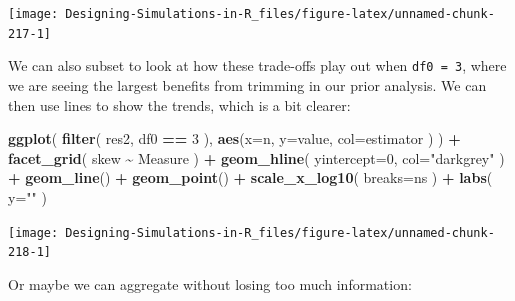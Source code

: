 \documentclass[
]{book}
\newenvironment{Shaded}{\begin{snugshade}}{\end{snugshade}}
\newcommand{\AttributeTok}[1]{\textcolor[rgb]{0.13,0.29,0.53}{#1}}
\newcommand{\DecValTok}[1]{\textcolor[rgb]{0.00,0.00,0.81}{#1}}
\newcommand{\FunctionTok}[1]{\textcolor[rgb]{0.13,0.29,0.53}{\textbf{#1}}}
\newcommand{\NormalTok}[1]{#1}
\newcommand{\SpecialCharTok}[1]{\textcolor[rgb]{0.81,0.36,0.00}{\textbf{#1}}}
\newcommand{\StringTok}[1]{\textcolor[rgb]{0.31,0.60,0.02}{#1}}
\begin{document}
\begin{center}\texttt{[image: Designing-Simulations-in-R\_files/figure-latex/unnamed-chunk-217-1]} \end{center}

We can also subset to look at how these trade-offs play out when \texttt{df0\ =\ 3}, where we are seeing the largest benefits from trimming in our prior analysis.
We can then use lines to show the trends, which is a bit clearer:

\begin{Shaded}
\begin{Highlighting}[]
\FunctionTok{ggplot}\NormalTok{( }\FunctionTok{filter}\NormalTok{( res2, df0 }\SpecialCharTok{==} \DecValTok{3}\NormalTok{ ), }
        \FunctionTok{aes}\NormalTok{(}\AttributeTok{x=}\NormalTok{n, }\AttributeTok{y=}\NormalTok{value, }\AttributeTok{col=}\NormalTok{estimator ) ) }\SpecialCharTok{+}
    \FunctionTok{facet\_grid}\NormalTok{( skew }\SpecialCharTok{\textasciitilde{}}\NormalTok{ Measure ) }\SpecialCharTok{+}
    \FunctionTok{geom\_hline}\NormalTok{( }\AttributeTok{yintercept=}\DecValTok{0}\NormalTok{, }\AttributeTok{col=}\StringTok{"darkgrey"}\NormalTok{ ) }\SpecialCharTok{+}
    \FunctionTok{geom\_line}\NormalTok{() }\SpecialCharTok{+} \FunctionTok{geom\_point}\NormalTok{() }\SpecialCharTok{+}
    \FunctionTok{scale\_x\_log10}\NormalTok{( }\AttributeTok{breaks=}\NormalTok{ns ) }\SpecialCharTok{+}
    \FunctionTok{labs}\NormalTok{( }\AttributeTok{y=}\StringTok{""}\NormalTok{ )}
\end{Highlighting}
\end{Shaded}

\begin{center}\texttt{[image: Designing-Simulations-in-R\_files/figure-latex/unnamed-chunk-218-1]} \end{center}

Or maybe we can aggregate without losing too much information:
\end{document}
